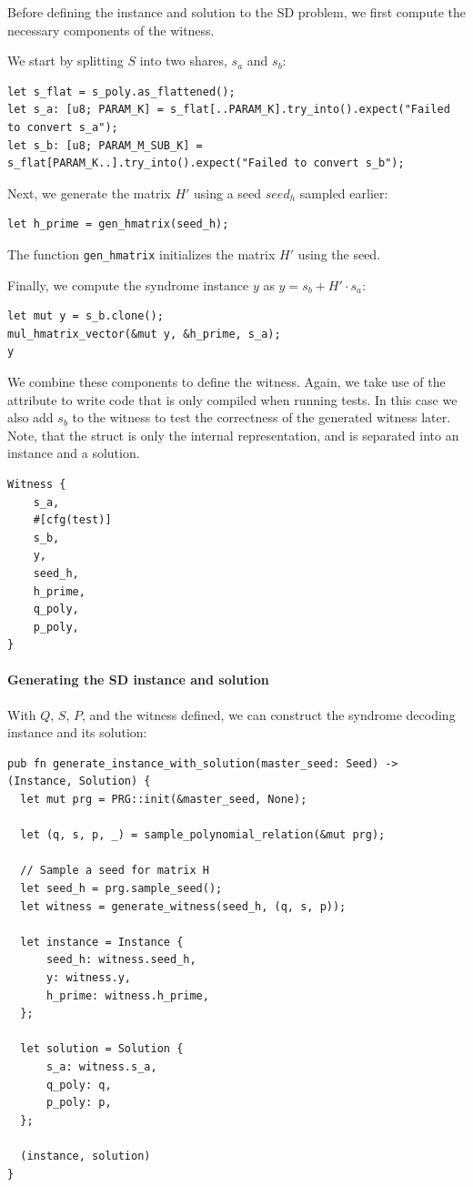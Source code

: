 \documentclass[11pt]{report}
\theoremstyle{definition}
\theoremstyle{plain}
\begin{document}
Before defining the instance and solution to the SD problem, we first compute the necessary components of the witness.

We start by splitting $S$ into two shares, $s_a$ and $s_b$:

\begin{verbatim}
let s_flat = s_poly.as_flattened();
let s_a: [u8; PARAM_K] = s_flat[..PARAM_K].try_into().expect("Failed to convert s_a");
let s_b: [u8; PARAM_M_SUB_K] = s_flat[PARAM_K..].try_into().expect("Failed to convert s_b");
\end{verbatim}

Next, we generate the matrix $H'$ using a seed $seed_h$ sampled earlier:

\begin{verbatim}
let h_prime = gen_hmatrix(seed_h);
\end{verbatim}

The function \texttt{gen\_hmatrix} initializes the matrix $H'$ using the seed.

Finally, we compute the syndrome instance $y$ as $y = s_b + H' \cdot s_a$:

\begin{verbatim}
let mut y = s_b.clone();
mul_hmatrix_vector(&mut y, &h_prime, s_a);
y
\end{verbatim}

We combine these components to define the witness. Again, we take use of the  attribute to write code that is only compiled when running tests. In this case we also add $s_b$ to the witness to test the correctness of the generated witness later. Note, that the  struct is only the internal representation, and is separated into an instance and a solution.

\begin{verbatim}
Witness {
    s_a,
    #[cfg(test)]
    s_b,
    y,
    seed_h,
    h_prime,
    q_poly,
    p_poly,
}
\end{verbatim}

\paragraph{Generating the SD instance and solution}

With $Q$, $S$, $P$, and the witness defined, we can construct the syndrome decoding instance and its solution:

\begin{verbatim}
pub fn generate_instance_with_solution(master_seed: Seed) -> (Instance, Solution) {
  let mut prg = PRG::init(&master_seed, None);

  let (q, s, p, _) = sample_polynomial_relation(&mut prg);

  // Sample a seed for matrix H
  let seed_h = prg.sample_seed();
  let witness = generate_witness(seed_h, (q, s, p));

  let instance = Instance {
      seed_h: witness.seed_h,
      y: witness.y,
      h_prime: witness.h_prime,
  };

  let solution = Solution {
      s_a: witness.s_a,
      q_poly: q,
      p_poly: p,
  };

  (instance, solution)
}
\end{verbatim}
\end{document}
